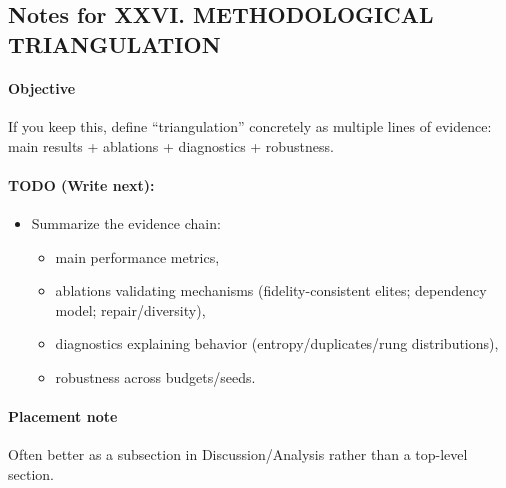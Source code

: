 \subsection*{Notes for XXVI. METHODOLOGICAL TRIANGULATION}
\paragraph{Objective}
If you keep this, define “triangulation” concretely as multiple lines of evidence: main results + ablations + diagnostics + robustness.

\paragraph{TODO (Write next):}
\begin{itemize}
  \item Summarize the evidence chain:
  \begin{itemize}
    \item main performance metrics,
    \item ablations validating mechanisms (fidelity-consistent elites; dependency model; repair/diversity),
    \item diagnostics explaining behavior (entropy/duplicates/rung distributions),
    \item robustness across budgets/seeds.
  \end{itemize}
\end{itemize}

\paragraph{Placement note}
Often better as a subsection in Discussion/Analysis rather than a top-level section.
